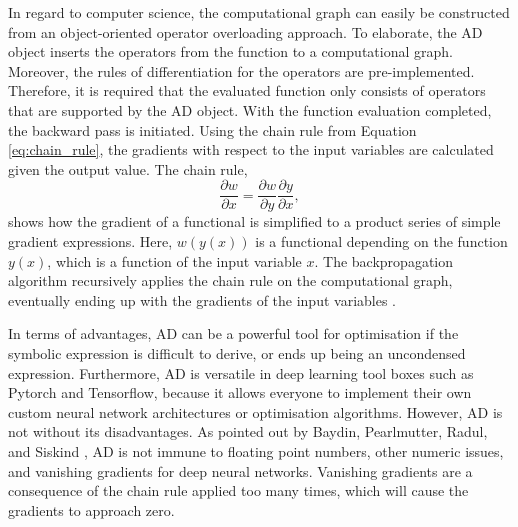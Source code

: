 
In regard to computer science, the computational graph can easily be constructed from an object-oriented operator overloading approach.
To elaborate, the AD object inserts the operators from the function to a computational graph.
Moreover, the rules of differentiation for the operators are pre-implemented.
Therefore, it is required that the evaluated function only consists of operators that are supported by the AD object.
With the function evaluation completed, the backward pass is initiated. Using the chain rule from Equation \eqref{eq:chain_rule},
the gradients with respect to the input variables are calculated given the output value.
The chain rule,
\begin{equation}\label{eq:chain_rule}
    \frac{\partial w}{\partial x} = \frac{\partial w}{\partial y} \frac{\partial y}{\partial x},
\end{equation}
shows how the gradient of a functional is simplified to a product series of simple gradient expressions.
Here, $w(y(x))$ is a functional depending on the function $y(x)$, which is a function of the input variable $x$.
The backpropagation algorithm recursively applies the chain rule on the computational graph, eventually ending up with the gradients of the input variables \cite{baydin2018automatic}.

In terms of advantages, AD can be a powerful tool for optimisation if the symbolic expression is difficult to derive, or ends up being an uncondensed expression.
Furthermore, AD is versatile in deep learning tool boxes such as Pytorch and Tensorflow,
because it allows everyone to implement their own custom neural network architectures or optimisation algorithms.
However, AD is not without its disadvantages. As pointed out by Baydin, Pearlmutter, Radul, and Siskind \cite{baydin2018automatic},
AD is not immune to floating point numbers, other numeric issues, and vanishing gradients for deep neural networks.
Vanishing gradients are a consequence of the chain rule applied too many times, which will cause the gradients to approach zero.







